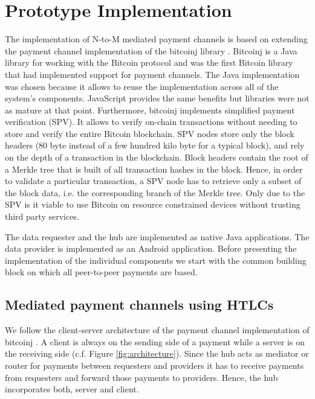 \section{Prototype Implementation}
\label{sec:implementation}

The implementation of N-to-M mediated payment channels is based on extending the payment channel implementation of the bitcoinj library \cite{Bitcoinj}. Bitcoinj is a Java library for working with the Bitcoin protocol and was the first Bitcoin library that had implemented support for payment channels. The Java implementation was chosen because it allows to reuse the implementation across all of the system's components. JavaScript provides the same benefits but libraries were not as mature at that point. Furthermore, bitcoinj implements simplified payment verification (SPV). It allows to verify on-chain transactions without needing to store and verify the entire Bitcoin blockchain. SPV nodes store only the block headers (80 byte instead of a few hundred kilo byte for a typical block), and rely on the depth of a transaction in the blockchain. Block headers contain the root of a Merkle tree that is built of all transaction hashes in the block. Hence, in order to validate a particular transaction, a SPV node has to retrieve only a subset of the block data, i.e. the corresponding branch of the Merkle tree.
Only due to the SPV is it viable to use Bitcoin on resource constrained devices without trusting third party services.

The data requester and the hub are implemented as native Java applications. The data provider is implemented as an Android application. Before presenting the implementation of the individual components we start with the common building block on which all peer-to-peer payments are based. 

\subsection{Mediated payment channels using HTLCs}

We follow the client-server architecture of the payment channel implementation of bitcoinj \cite{BitcoinjPC}. A client is always on the sending side of a payment while a server is on the receiving side (c.f. Figure \ref{fig:architecture}). Since the hub acts as mediator or router for payments between requesters and providers it has to receive payments from requesters and forward those payments to providers. Hence, the hub incorporates both, server and client.

